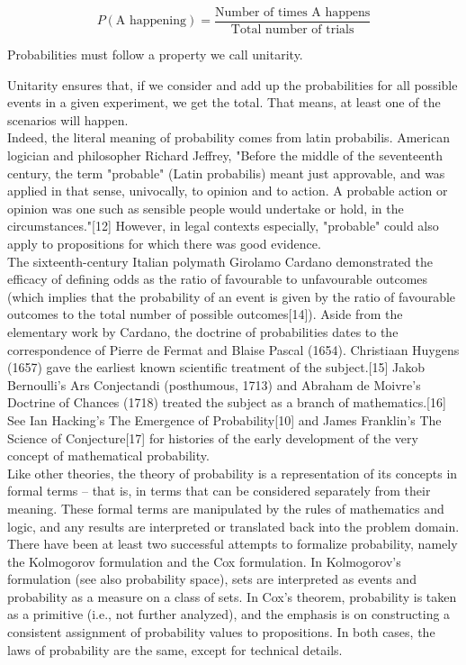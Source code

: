 \documentclass{book}
\begin{document}
\begin{equation}
	P(\text{A happening}) = \frac{\text{Number of times A happens}}{\text{Total number of trials}}
\end{equation}

Probabilities must follow a property we call unitarity.


Unitarity ensures that, if we consider and add up the probabilities for all possible events in a given experiment, we get the total. That means, at least one of the scenarios will happen.\\

Indeed, the literal meaning of probability comes from latin probabilis. American logician and philosopher Richard Jeffrey, "Before the middle of the seventeenth century, the term "probable" (Latin probabilis) meant just approvable, and was applied in that sense, univocally, to opinion and to action. A probable action or opinion was one such as sensible people would undertake or hold, in the circumstances."[12] However, in legal contexts especially, "probable" could also apply to propositions for which there was good evidence.\\

The sixteenth-century Italian polymath Girolamo Cardano demonstrated the efficacy of defining odds as the ratio of favourable to unfavourable outcomes (which implies that the probability of an event is given by the ratio of favourable outcomes to the total number of possible outcomes[14]). Aside from the elementary work by Cardano, the doctrine of probabilities dates to the correspondence of Pierre de Fermat and Blaise Pascal (1654). Christiaan Huygens (1657) gave the earliest known scientific treatment of the subject.[15] Jakob Bernoulli's Ars Conjectandi (posthumous, 1713) and Abraham de Moivre's Doctrine of Chances (1718) treated the subject as a branch of mathematics.[16] See Ian Hacking's The Emergence of Probability[10] and James Franklin's The Science of Conjecture[17] for histories of the early development of the very concept of mathematical probability.\\

Like other theories, the theory of probability is a representation of its concepts in formal terms – that is, in terms that can be considered separately from their meaning. These formal terms are manipulated by the rules of mathematics and logic, and any results are interpreted or translated back into the problem domain.\\

There have been at least two successful attempts to formalize probability, namely the Kolmogorov formulation and the Cox formulation. In Kolmogorov's formulation (see also probability space), sets are interpreted as events and probability as a measure on a class of sets. In Cox's theorem, probability is taken as a primitive (i.e., not further analyzed), and the emphasis is on constructing a consistent assignment of probability values to propositions. In both cases, the laws of probability are the same, except for technical details.\\
\end{document}

